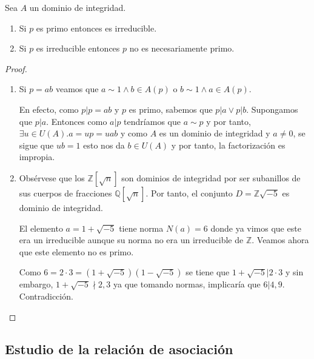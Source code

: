 \begin{proposition}
Sea $A$ un dominio de integridad. 

\begin{enumerate}
\item Si $p$ es primo entonces  es irreducible.
\item Si $p$ es irreducible entonces $p$ no es necesariamente primo. 
\end{enumerate}
\end{proposition}
\begin{proof}
\begin{enumerate}
\item Si $p = ab$ veamos que $a \sim 1 \land b \in A(p)$ o $b \sim 1 \land a \in A(p)$. 

En efecto, como $p|p = ab$ y $p$ es primo, sabemos que $p|a \lor p|b$. Supongamos que $p|a$. Entonces como $a|p$ tendríamos que $a \sim p$ y por tanto, $\exists u \in U(A). a = up = uab$ y como $A$ es un dominio de integridad y $a \neq 0$, se sigue que $ub = 1$ esto nos da $b \in U(A)$ y por tanto, la factorización es impropia.

\item Obsérvese que los $\mathbb{Z}[\sqrt{n}]$ son dominios de integridad por ser subanillos de sus cuerpos de fracciones $\mathbb{Q}[\sqrt{n}]$. Por tanto, el conjunto $D = \mathbb{Z}{\sqrt{-5}}$ es dominio de integridad. 

El elemento $a = 1 + \sqrt{-5}$ tiene norma $N(a) = 6$ donde ya vimos que este era un irreducible aunque su norma no era un irreducible de $\mathbb{Z}$. Veamos ahora que este elemento no es primo. 

Como $6 = 2 \cdot 3 = (1+\sqrt{-5})(1-\sqrt{-5})$ se tiene que $1+\sqrt{-5}| 2 \cdot 3$ y sin embargo, $1+\sqrt{-5} \nmid 2,3$ ya que tomando normas, implicaría que $6|4,9$. Contradicción.
\end{enumerate}
\end{proof}

\subsection{Estudio de la relación de asociación}

